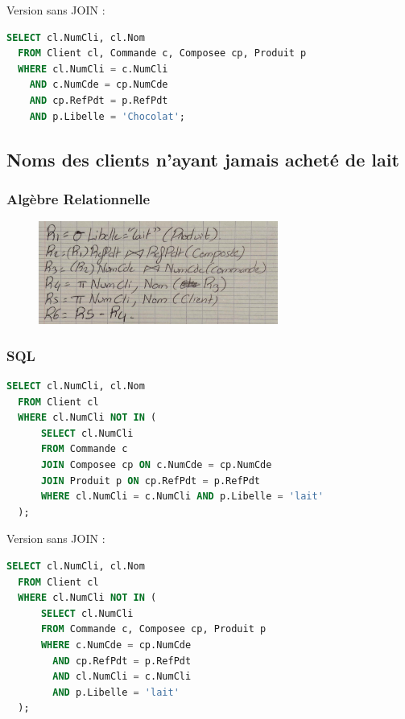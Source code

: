 \documentclass{article}
\begin{document}
Version sans JOIN :

\begin{lstlisting}[language=SQL]
  SELECT cl.NumCli, cl.Nom 
  FROM Client cl, Commande c, Composee cp, Produit p
  WHERE cl.NumCli = c.NumCli 
    AND c.NumCde = cp.NumCde 
    AND cp.RefPdt = p.RefPdt 
    AND p.Libelle = 'Chocolat';
\end{lstlisting}

\subsection{Noms des clients n’ayant jamais acheté de lait}

\subsubsection{Algèbre Relationnelle}

\begin{figure}[H]
  \centering
  \includegraphics[width=0.7\textwidth]{alg/8.png}
  \label{fig:alg-rel}
\end{figure}

\subsubsection{SQL}

\begin{lstlisting}[language=SQL]
  SELECT cl.NumCli, cl.Nom 
  FROM Client cl
  WHERE cl.NumCli NOT IN (
      SELECT cl.NumCli
      FROM Commande c
      JOIN Composee cp ON c.NumCde = cp.NumCde
      JOIN Produit p ON cp.RefPdt = p.RefPdt
      WHERE cl.NumCli = c.NumCli AND p.Libelle = 'lait'
  );
\end{lstlisting}

Version sans JOIN :

\begin{lstlisting}[language=SQL]
  SELECT cl.NumCli, cl.Nom 
  FROM Client cl
  WHERE cl.NumCli NOT IN (
      SELECT cl.NumCli
      FROM Commande c, Composee cp, Produit p
      WHERE c.NumCde = cp.NumCde 
        AND cp.RefPdt = p.RefPdt 
        AND cl.NumCli = c.NumCli 
        AND p.Libelle = 'lait'
  );
\end{lstlisting}
\end{document}
